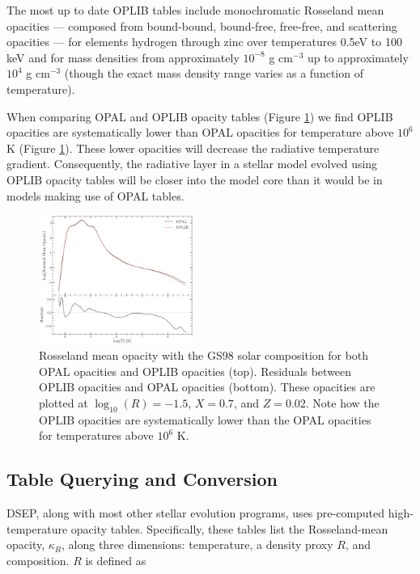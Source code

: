 The most up to date OPLIB tables include monochromatic Rosseland mean opacities
--- composed from bound-bound, bound-free, free-free, and scattering opacities
--- for elements hydrogen through zinc over temperatures 0.5eV to 100 keV and
for mass densities from approximately $10^{-8}$ g cm$^{-3}$ up to approximately
$10^{4}$ g cm$^{-3}$ (though the exact mass density range varies as a function
of temperature). 

When comparing OPAL and OPLIB opacity tables (Figure \ref{fig:opacComp}) we
find OPLIB opacities are systematically lower than OPAL opacities for
temperature above $10^{6}$ K (Figure \ref{fig:opacComp}). These lower opacities
will decrease the radiative temperature gradient. Consequently, the radiative
layer in a stellar model evolved using OPLIB opacity tables will be closer into
the model core than it would be in models making use of OPAL tables.

\begin{figure}
	\centering
	\includegraphics[width=0.45\textwidth]{src/figures/OpacityComparision.pdf}
	\caption{Rosseland mean opacity with the GS98 solar composition for both
	OPAL opacities and OPLIB opacities (top). Residuals between OPLIB opacities
	and OPAL opacities (bottom). These opacities are plotted at $\log _{10}(R)
	= -1.5$, $X=0.7$, and $Z=0.02$. Note how the OPLIB opacities are
	systematically lower than the OPAL opacities for temperatures above $10^6$
	K.}
	\label{fig:opacComp}
\end{figure}

\subsection{Table Querying and Conversion}
DSEP, along with most other stellar evolution programs, uses pre-computed
high-temperature opacity tables. Specifically, these tables list the
Rosseland-mean opacity, $\kappa_{R}$, along three dimensions: temperature, a
density proxy $R$, and composition. $R$ is defined as

